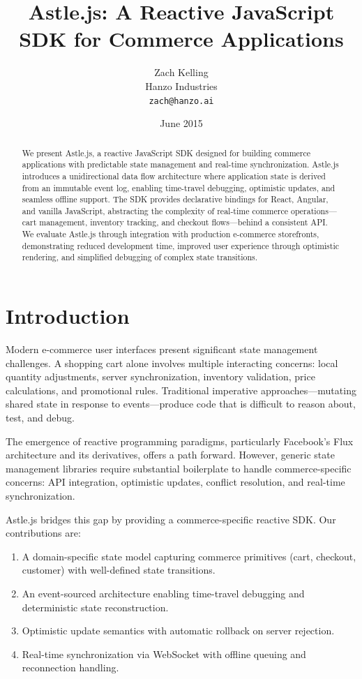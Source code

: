 \documentclass[11pt,twocolumn]{article}
\title{Astle.js: A Reactive JavaScript SDK for Commerce Applications}
\author{Zach Kelling\\
Hanzo Industries\\
\texttt{zach@hanzo.ai}}
\date{June 2015}
\begin{document}
\luxcoverpage

\begin{abstract}
We present Astle.js, a reactive JavaScript SDK designed for building commerce applications with predictable state management and real-time synchronization. Astle.js introduces a unidirectional data flow architecture where application state is derived from an immutable event log, enabling time-travel debugging, optimistic updates, and seamless offline support. The SDK provides declarative bindings for React, Angular, and vanilla JavaScript, abstracting the complexity of real-time commerce operations—cart management, inventory tracking, and checkout flows—behind a consistent API. We evaluate Astle.js through integration with production e-commerce storefronts, demonstrating reduced development time, improved user experience through optimistic rendering, and simplified debugging of complex state transitions.
\end{abstract}

\section{Introduction}

Modern e-commerce user interfaces present significant state management challenges. A shopping cart alone involves multiple interacting concerns: local quantity adjustments, server synchronization, inventory validation, price calculations, and promotional rules. Traditional imperative approaches—mutating shared state in response to events—produce code that is difficult to reason about, test, and debug.

The emergence of reactive programming paradigms, particularly Facebook's Flux architecture \cite{flux2014} and its derivatives, offers a path forward. However, generic state management libraries require substantial boilerplate to handle commerce-specific concerns: API integration, optimistic updates, conflict resolution, and real-time synchronization.

Astle.js bridges this gap by providing a commerce-specific reactive SDK. Our contributions are:

\begin{enumerate}
\item A domain-specific state model capturing commerce primitives (cart, checkout, customer) with well-defined state transitions.
\item An event-sourced architecture enabling time-travel debugging and deterministic state reconstruction.
\item Optimistic update semantics with automatic rollback on server rejection.
\item Real-time synchronization via WebSocket with offline queuing and reconnection handling.
\end{enumerate}
\end{document}
